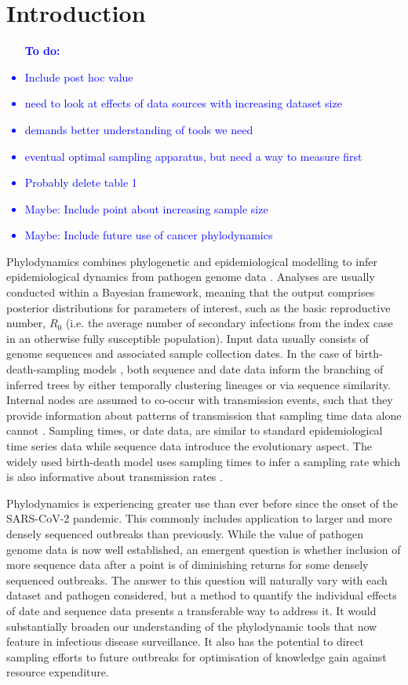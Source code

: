 \documentclass{article}
\newcommand{\ignore}[1]{}
\begin{document}
\section*{Introduction}
\textcolor{blue}{\begin{itemize}
    \item [\textbf{To do:}]
    \item Include post hoc value
    \item need to look at effects of data sources with increasing dataset size
    \item demands better understanding of tools we need
    \item eventual optimal sampling apparatus, but need a way to measure first
    \item Probably delete table 1
    \item Maybe: Include point about increasing sample size
    \item Maybe: Include future use of cancer phylodynamics
\end{itemize}}
Phylodynamics combines phylogenetic and epidemiological modelling to infer epidemiological dynamics from pathogen genome data \citep{du2015getting,baele2018recent,volz2013viral}. Analyses are usually conducted within a Bayesian framework, meaning that the output comprises posterior distributions for parameters of interest, such as the basic reproductive number, $R_{0}$ (i.e. the average number of secondary infections from the index case in an otherwise fully susceptible population). Input data usually consists of genome sequences and associated sample collection dates. In the case of birth-death-sampling models \citep{stadler_sampling-through-time_2010}, both sequence and date data inform the branching of inferred trees by either temporally clustering lineages or via sequence similarity.  Internal nodes are assumed to co-occur with transmission events, such that they provide information about patterns of transmission that sampling time data alone cannot \ignore{cite review when out}. Sampling times, or date data, are similar to standard epidemiological time series data while sequence data introduce the evolutionary aspect. The widely used birth-death model uses sampling times to infer a sampling rate which is also informative about transmission rates \citep{boskova2018influence,stadler2012estimating}. 

Phylodynamics is experiencing greater use than ever before since the onset of the SARS-CoV-2 pandemic. This commonly includes application to larger and more densely sequenced outbreaks than previously. While the value of pathogen genome data is now well established, an emergent question is whether inclusion of more sequence data after a point is of diminishing returns for some densely sequenced outbreaks. The answer to this question will  naturally vary with each dataset and pathogen considered, but a method to quantify the individual effects of date and sequence data presents a transferable way to address it. It would substantially broaden our understanding of the phylodynamic tools that now feature in infectious disease surveillance. It also has the potential to direct sampling efforts to future outbreaks for optimisation of knowledge gain against resource expenditure. 
\end{document}
